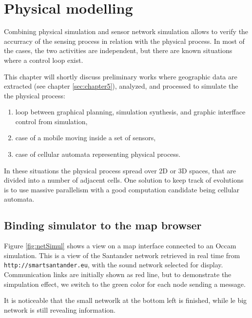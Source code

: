 
\chapter{Physical modelling}

Combining physical simulation and sensor network simulation allows to verify
the accurracy of the sensing process in relation with the physical process.
In most of the cases, the two activities are independent, but there are known situations
where a control loop exist.

This chapter will shortly discuss preliminary works where geographic data are
extracted (see chapter \ref{sec:chapter5}), analyzed, and processed to simulate the
the physical process:
\begin{enumerate}
\item loop between graphical planning, simulation synthesis, and graphic interfface control from simulation,
\item case of a mobile moving inside a set of sensors,
\item case of cellular automata representing physical process.
\end{enumerate}


In these situations the physical process spread over 2D or 3D spaces, that are
divided into a number of adjacent cells. One solution to keep track of evolutions 
is to use massive parallelism with a good computation candidate being cellular automata.


\section{Binding  simulator to the map browser}
Figure
\ref{fig:netSimul} shows a view on a map interface connected to an Occam simulation. 
This is a view of the Santander network retrieved in real time from {\tt http://smartsantander.eu},
with the sound network selected for display. Communication links are initially shown as red line,
but to demonstrate the simpulation effect, we switch to the green color for each node sending
a message. 

It is noticeable that the small networlk at the bottom left is finished, while le big network 
is still revealing information.



